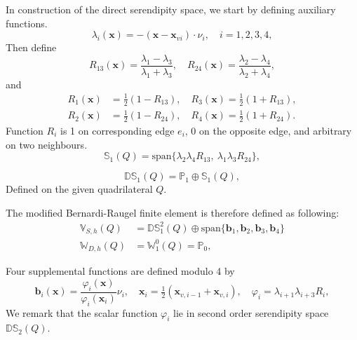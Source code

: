 \documentclass[usenames,dvipsnames,letterpaper,landscape,final]{slides}
\begin{document}
\begin{myslideNoFooter}
 In construction of the direct serendipity space, we start by defining auxiliary functions.
\begin{equation*}
       \lambda_i(\mathbf{x}) = -(\mathbf{x} - \mathbf{x}_{vi})\cdot\nu_i,\quad i=1,2,3,4,
\end{equation*}
Then define
\begin{equation*}
        R_{13}(\mathbf{x}) = \frac{\lambda_1 - \lambda_3}{\lambda_1 + \lambda_3},\quad
        R_{24}(\mathbf{x}) = \frac{\lambda_2 - \lambda_4}{\lambda_2 + \lambda_4},
\end{equation*}
and 
\begin{equation*}
  \begin{aligned}
 R_1(\mathbf{x}) &= \tfrac{1}{2}(1-R_{13}),\quad
        R_3(\mathbf{x}) = \tfrac{1}{2}(1+R_{13}),\\
 R_2(\mathbf{x}) &= \tfrac{1}{2}(1-R_{24}),\quad
        R_4(\mathbf{x}) = \tfrac{1}{2}(1+R_{24}).
 \end{aligned}
\end{equation*}
Function $R_i$ is 1 on corresponding edge $e_i$, 0 on the 
opposite edge, and arbitrary on two neighbours.
\begin{equation*}
    \mathbb{S}_1(Q) = \text{span}\big\{
        \lambda_2\lambda_4 R_{13},\ \lambda_1\lambda_3 R_{24}\big\},
\end{equation*}
    
\begin{equation*}
\mathbb{DS}_1(Q) = \mathbb{P}_1\oplus\mathbb{S}_1(Q),
\end{equation*}
Defined on the given quadrilateral $Q$.

\end{myslideNoFooter}

\begin{myslideNoFooter}
The modified Bernardi-Raugel finite element is
therefore defined as following:
\begin{equation*}
    \begin{aligned}
    \mathbb{V}_{S,h}(Q)&= \mathbb{DS}_1^2(Q)\oplus \text{span}\{\mathbf{b}_1, \mathbf{b}_2,\mathbf{b}_3, \mathbf{b}_4\}\\
    \mathbb{W}_{D,h}(Q) &= \mathbb{W}_1^0(Q) = \mathbb{P}_0,
\end{aligned}
\end{equation*}

\bigskip
{} 

Four supplemental functions are defined modulo 4 by
\begin{equation*} 
     \mathbf{b}_i(\mathbf{x}) = \frac{\varphi_{i}(\mathbf{x})}{\varphi_{i}(\mathbf{x}_{i})} \nu_{i},\quad
     \mathbf{x}_i = \tfrac12(\mathbf{x}_{v,i-1}+\mathbf{x}_{v,i}),\quad
     \varphi_{i} = \lambda_{i+1}\lambda_{i+3}R_i,
\end{equation*}
We remark that the scalar function $\varphi_i$ lie in second order
serendipity space $\mathbb{DS}_2(Q)$.
\end{myslideNoFooter}
\end{document}
